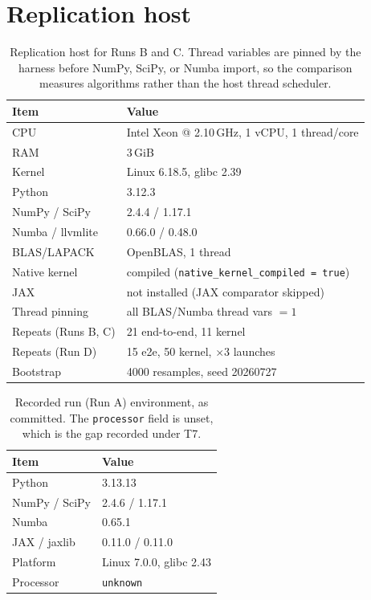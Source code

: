 \documentclass[twocolumn,10pt,a4paper]{article}
\theoremstyle{plain}
\theoremstyle{definition}
\begin{document}
\section{Replication host}
\label{app:host}

\begin{table}[t]
\centering\small
\caption{Replication host for Runs B and C. Thread variables are pinned by the
harness before NumPy, SciPy, or Numba import, so the comparison measures
algorithms rather than the host thread scheduler.}
\label{tab:host}
\begin{tabular}{ll}
\toprule
Item & Value \\
\midrule
CPU & Intel Xeon @ 2.10\,GHz, 1 vCPU, 1 thread/core \\
RAM & 3\,GiB \\
Kernel & Linux 6.18.5, glibc 2.39 \\
Python & 3.12.3 \\
NumPy / SciPy & 2.4.4 / 1.17.1 \\
Numba / llvmlite & 0.66.0 / 0.48.0 \\
BLAS/LAPACK & OpenBLAS, 1 thread \\
Native kernel & compiled (\texttt{native\_kernel\_compiled = true}) \\
JAX & not installed (JAX comparator skipped) \\
Thread pinning & all BLAS/Numba thread vars $= 1$ \\
Repeats (Runs B, C) & 21 end-to-end, 11 kernel \\
Repeats (Run D) & 15 e2e, 50 kernel, $\times 3$ launches \\
Bootstrap & 4000 resamples, seed 20260727 \\
\bottomrule
\end{tabular}
\end{table}

\begin{table}[t]
\centering\small
\caption{Recorded run (Run A) environment, as committed. The \texttt{processor}
field is unset, which is the gap recorded under T7.}
\label{tab:hostA}
\begin{tabular}{ll}
\toprule
Item & Value \\
\midrule
Python & 3.13.13 \\
NumPy / SciPy & 2.4.6 / 1.17.1 \\
Numba & 0.65.1 \\
JAX / jaxlib & 0.11.0 / 0.11.0 \\
Platform & Linux 7.0.0, glibc 2.43 \\
Processor & \texttt{unknown} \\
\bottomrule
\end{tabular}
\end{table}
\end{document}

